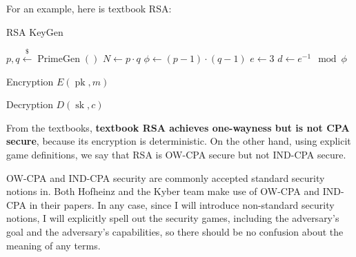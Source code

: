 \documentclass{article}
\newcommand{\leftsample}{\overset{{\scriptscriptstyle\$}}{\leftarrow}}
\newcommand{\pk}{\operatorname{pk}}
\newcommand{\sk}{\operatorname{sk}}
\begin{document}
For an example, here is textbook RSA:

\begin{multicols}{2}
    \begin{algorithm}[H]
        \caption{RSA KeyGen}
        $p, q \leftsample \operatorname{PrimeGen}()$\;
        $N \leftarrow p \cdot q$\;
        $\phi \leftarrow (p-1)\cdot(q-1)$\;
        $e \leftarrow 3$\;
        $d \leftarrow e^{-1} \mod \phi$\;
        \Return{
            $\pk = (N, e)$, $\sk = d$
        }
    \end{algorithm}

    \begin{algorithm}[H]
        \caption{Encryption $E(\pk, m)$}
    \end{algorithm}

    \begin{algorithm}[H]
        \caption{Decryption $D(\sk, c)$}
    \end{algorithm}
\end{multicols}

From the textbooks, \textbf{textbook RSA achieves one-wayness but is not CPA secure}, because its encryption is deterministic. On the other hand, using explicit game definitions, we say that RSA is OW-CPA secure but not IND-CPA secure.

OW-CPA and IND-CPA security are commonly accepted standard security notions in. Both Hofheinz\cite{hofheinz2017modular} and the Kyber team\cite{bos2018crystals} make use of OW-CPA and IND-CPA in their papers. In any case, since I will introduce non-standard security notions, I will explicitly spell out the security games, including the adversary's goal and the adversary's capabilities, so there should be no confusion about the meaning of any terms.



\end{document}

